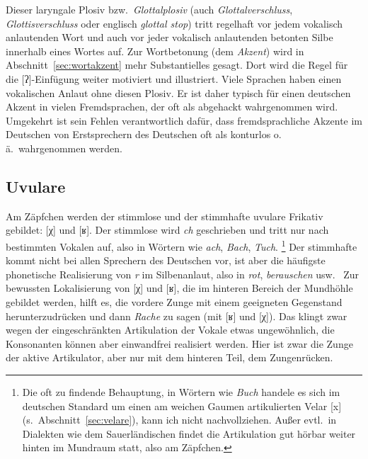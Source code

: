 \begin{exe}
  \ex\label{ex:laryngale005}
  \begin{xlist}
  \end{xlist}
\end{exe}

Dieser laryngale Plosiv bzw.\ \textit{Glottalplosiv} (auch \textit{Glottalverschluss}, \textit{Glottisverschluss} oder englisch \textit{glottal stop}) tritt regelhaft vor jedem vokalisch anlautenden Wort und auch vor jeder vokalisch anlautenden betonten Silbe innerhalb eines Wortes auf.
Zur Wortbetonung (dem \textit{Akzent}) wird in Abschnitt~\ref{sec:wortakzent} mehr Substantielles gesagt.
Dort wird die Regel für die [ʔ]-Einfügung weiter motiviert und illustriert.
Viele Sprachen haben einen vokalischen Anlaut ohne diesen Plosiv.
Er ist daher typisch für einen deutschen Akzent in vielen Fremdsprachen, der oft als abgehackt wahrgenommen wird.
Umgekehrt ist sein Fehlen verantwortlich dafür, dass fremdsprachliche Akzente im Deutschen von Erstsprechern des Deutschen oft als konturlos o.\,ä.\ wahrgenommen werden.

\Stretch
\Enl[-1]

\subsection{Uvulare}
\label{sec:uvulare}


Am Zäpfchen werden der stimmlose und der stimmhafte uvulare Frikativ gebildet: [χ] und [ʁ].
Der stimmlose wird \textit{ch} geschrieben und tritt nur nach bestimmten Vokalen auf, also in Wörtern wie \textit{ach}, \textit{Bach}, \textit{Tuch}.%
\footnote{Die oft zu findende Behauptung, in Wörtern wie \textit{Buch} handele es sich im deutschen Standard um einen am weichen Gaumen artikulierten Velar [x] (s.\ Abschnitt~\ref{sec:velare}), kann ich nicht nachvollziehen.
Außer evtl.\ in Dialekten wie dem Sauerländischen findet die Artikulation gut hörbar weiter hinten im Mundraum statt, also am Zäpfchen.
}
Der stimmhafte kommt nicht bei allen Sprechern des Deutschen vor, ist aber die häufigste phonetische Realisierung von \textit{r} im Silbenanlaut, also in \textit{rot}, \textit{berauschen} usw.
\TuBegin~Zur bewussten Lokalisierung von [χ] und [ʁ], die im hinteren Bereich der Mundhöhle gebildet werden, hilft es, die vordere Zunge mit einem geeigneten Gegenstand herunterzudrücken und dann \zB \textit{Rache} zu sagen (mit [ʁ] und [χ]).
Das klingt zwar wegen der eingeschränkten Artikulation der Vokale etwas ungewöhnlich, die Konsonanten können aber einwandfrei realisiert werden.
Hier ist zwar die Zunge der aktive Artikulator, aber nur mit dem hinteren Teil, dem Zungenrücken.

